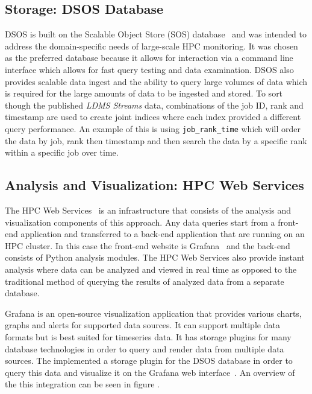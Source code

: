 \subsection{Storage: DSOS Database}
DSOS is built on the Scalable Object Store (SOS) database~\cite{sosgithub} and was intended to address the domain-specific needs of large-scale HPC monitoring. It was chosen as the preferred database because it allows for interaction via a command line interface which allows for fast query testing and data examination. DSOS also provides scalable data ingest and the ability to query large volumes of data which is required for the large amounts of data to be ingested and stored. %
To sort though the published \emph{LDMS Streams} data, combinations of the job ID, rank and timestamp are used to create joint indices where each index provided a different query performance. An example of this is using \texttt{job\_rank\_time} which will order the data by job, rank then timestamp and then search the data by a specific rank within a specific job over time.

\subsection{Analysis and Visualization: HPC Web Services}
The HPC Web Services~\cite{ClusterAV} is an infrastructure that consists of the analysis and visualization components of this approach. Any data queries start from a front-end application and transferred to a back-end application that are running on an HPC cluster. In this case the front-end website is Grafana~\cite{grafana-website} and the back-end consists of Python analysis modules. The HPC Web Services also provide instant analysis where data can be analyzed and viewed in real time as opposed to the traditional method of querying the results of analyzed data from a separate database.

Grafana is an open-source visualization application that provides various charts, graphs and alerts for supported data sources. It can support multiple data formats but is best suited for timeseries data. It has storage plugins for many database technologies in order to query and render data from multiple data sources. The \Darshan implemented a storage plugin for the DSOS database in order to query this data and visualize it on the Grafana web interface~\cite{grafana-website}. An overview of the this integration can be seen in figure .

